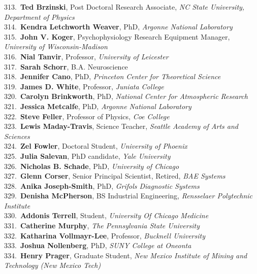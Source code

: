 313.~{\bf Ted Brzinski}, Post Doctoral Research Associate, {\sl NC State University, Department of Physics} \\
314.~{\bf Kendra Letchworth Weaver}, PhD, {\sl Argonne National Laboratory} \\
315.~{\bf John V. Koger}, Psychophysiology Research Equipment Manager, {\sl University of Wisconsin-Madison} \\
316.~{\bf Nial Tanvir}, Professor, {\sl University of Leicester} \\
317.~{\bf Sarah Schorr}, B.A. Neuroscience \\
318.~{\bf Jennifer Cano}, PhD, {\sl Princeton Center for Theoretical Science} \\
319.~{\bf James D. White}, Professor, {\sl Juniata College} \\
320.~{\bf Carolyn Brinkworth}, PhD, {\sl National Center for Atmospheric Research} \\
321.~{\bf Jessica Metcalfe}, PhD, {\sl Argonne National Laboratory} \\
322.~{\bf Steve Feller}, Professor of Physics, {\sl Coe College} \\
323.~{\bf Lewis Maday-Travis}, Science Teacher, {\sl Seattle Academy of Arts and Sciences} \\
324.~{\bf Zel Fowler}, Doctoral Student, {\sl University of Phoenix} \\
325.~{\bf Julia Salevan}, PhD candidate, {\sl Yale University} \\
326.~{\bf Nicholas B. Schade}, PhD, {\sl University of Chicago} \\
327.~{\bf Glenn Corser}, Senior Principal Scientist, Retired, {\sl BAE Systems} \\
328.~{\bf Anika Joseph-Smith}, PhD, {\sl Grifols Diagnostic Systems} \\
329.~{\bf Denisha McPherson}, BS Industrial Engineering, {\sl Rensselaer Polytechnic Institute} \\
330.~{\bf Addonis Terrell}, Student, {\sl University Of Chicago Medicine} \\
331.~{\bf Catherine Murphy}, {\sl The Pennsylvania State University} \\
332.~{\bf Katharina Vollmayr-Lee}, Professor, {\sl Bucknell University} \\
333.~{\bf Joshua Nollenberg}, PhD, {\sl SUNY College at Oneonta} \\
334.~{\bf Henry Prager}, Graduate Student, {\sl New Mexico Institute of Mining and Technology (New Mexico Tech)} \\
